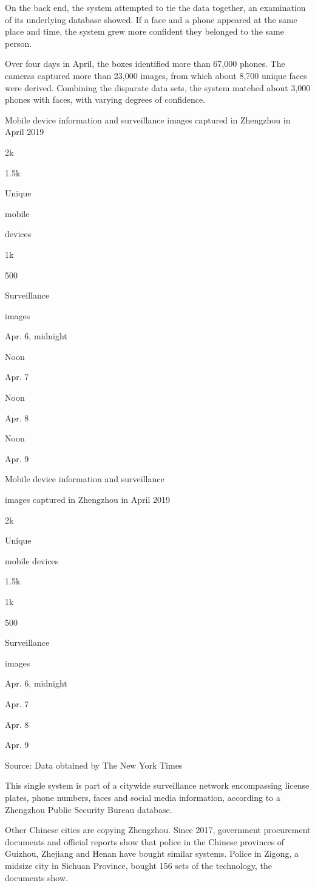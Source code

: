 On the back end, the system attempted to tie the data together, an
examination of its underlying database showed. If a face and a phone
appeared at the same place and time, the system grew more confident they
belonged to the same person.

Over four days in April, the boxes identified more than 67,000 phones.
The cameras captured more than 23,000 images, from which about 8,700
unique faces were derived. Combining the disparate data sets, the system
matched about 3,000 phones with faces, with varying degrees of
confidence.

Mobile device information and surveillance images captured in Zhengzhou
in April 2019

2k

1.5k

Unique

mobile

devices

1k

500

Surveillance

images

Apr. 6, midnight

Noon

Apr. 7

Noon

Apr. 8

Noon

Apr. 9

Mobile device information and surveillance

images captured in Zhengzhou in April 2019

2k

Unique

mobile devices

1.5k

1k

500

Surveillance

images

Apr. 6, midnight

Apr. 7

Apr. 8

Apr. 9

Source: Data obtained by The New York Times

This single system is part of a citywide surveillance network
encompassing license plates, phone numbers, faces and social media
information, according to a Zhengzhou Public Security Bureau database.

Other Chinese cities are copying Zhengzhou. Since 2017, government
procurement documents and official reports show that police in the
Chinese provinces of Guizhou, Zhejiang and Henan have bought similar
systems. Police in Zigong, a midsize city in Sichuan Province, bought
156 sets of the technology, the documents show.

